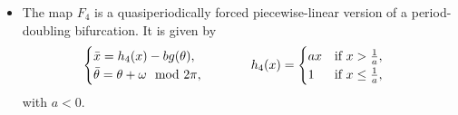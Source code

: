 \documentclass[12pt]{article}
\theoremstyle{plain}
\theoremstyle{remark}
\theoremstyle{definition}
\begin{document}
\begin{itemize}
    \item The map $F_4$ is a quasiperiodically forced piecewise-linear version of a period-doubling bifurcation. It is given by
    \begin{align}\label{dyn_sys_4}
        \begin{cases}
            \Bar{x} = h_{4}(x) - b g(\theta),\\
            \Bar{\theta} = \theta + \omega \mod2\pi,
        \end{cases}
        &\hspace{1cm}
        h_{4}(x)= 
        \begin{cases}
            ax & \text{if }x>\frac{1}{a},\\
            1 &\text{if }x\leq \frac{1}{a},
        \end{cases}
    \end{align}
    with $a<0$.
\end{itemize}
\end{document}
